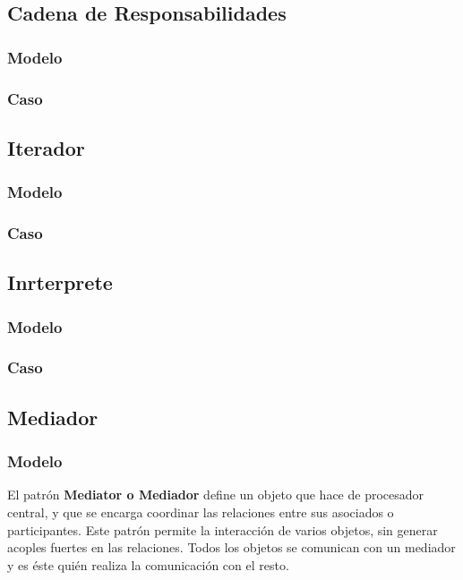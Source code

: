 \subsection{Cadena de Responsabilidades}
\subsubsection{Modelo}
\newpage
\subsubsection{Caso}
\newpage

\subsection{Iterador}
\subsubsection{Modelo}
\newpage
\subsubsection{Caso}
\newpage

\subsection{Inrterprete}
\subsubsection{Modelo}
\newpage
\subsubsection{Caso}
\newpage

\subsection{Mediador}

\subsubsection{Modelo}
El patrón \textbf{Mediator o Mediador} define un objeto que hace de procesador central, y que se encarga coordinar las relaciones entre sus asociados o participantes. Este patrón permite la interacción de varios objetos, sin generar acoples fuertes en las relaciones. Todos los objetos se comunican con un mediador y es éste quién realiza la comunicación con el resto.

